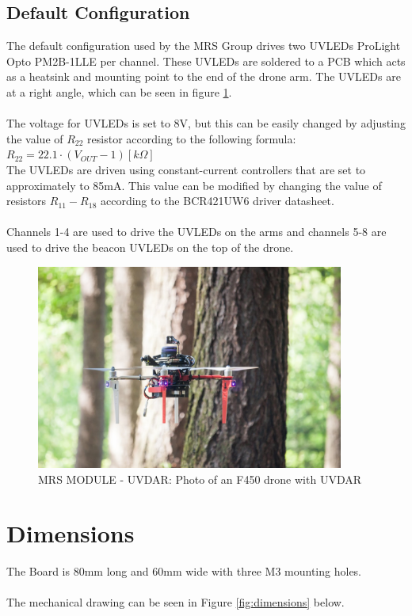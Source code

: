 \documentclass[12pt, a4paper]{article}
\begin{document}
\subsection{Default Configuration}
The default configuration used by the MRS Group drives two UVLEDs ProLight Opto PM2B-1LLE per channel. These UVLEDs are soldered to a PCB which acts as a heatsink and mounting point to the end of the drone arm. The UVLEDs are at a right angle, which can be seen in figure \ref{fig:f450_with_uvdar}.\\\
\\
The voltage for UVLEDs is set to 8V, but this can be easily changed by adjusting the value of $R_{22}$ resistor according to the following formula:\\
$R_{22} = 22.1 \cdot \left(V_{OUT} - 1 \right) \left[ k\Omega \right]$
\\
The UVLEDs are driven using constant-current controllers that are set to approximately to 85mA. This value can be modified by changing the value of resistors $R_{11} - R_{18}$ according to the BCR421UW6 driver datasheet.\\
\\
Channels 1-4 are used to drive the UVLEDs on the arms and channels 5-8 are used to drive the beacon UVLEDs on the top of the drone.

\begin{figure}[h]
\centering
\includegraphics[width=0.9\textwidth]{figures/f450_with_UVDAR.jpg}
\caption{MRS MODULE - UVDAR: Photo of an F450 drone with UVDAR}
\label{fig:f450_with_uvdar}
\end{figure}


\pagebreak
\section{Dimensions}
The Board is 80mm long and 60mm wide with three M3 mounting holes.\\
\\
The mechanical drawing can be seen in Figure \ref{fig:dimensions} below.
\end{document}
